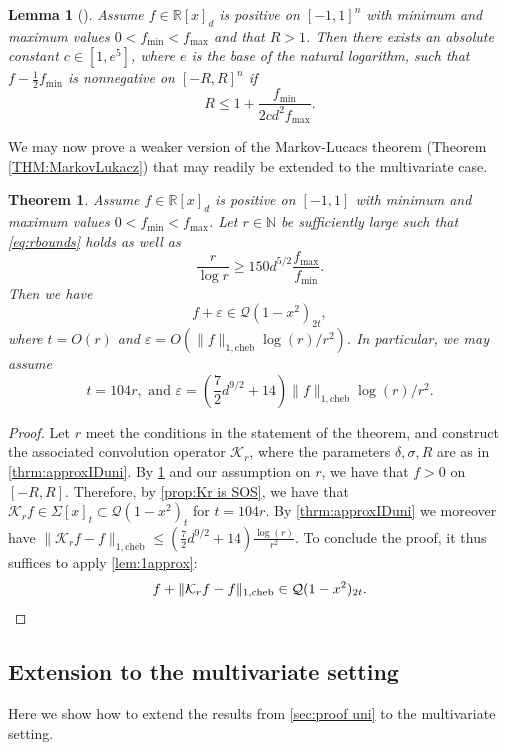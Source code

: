 \documentclass[11pt]{article}
\newcommand{\N}{\mathbb{N}}
\newcommand{\R}{\mathbb{R}}
\renewcommand{\min}{\mathrm{min}}
\renewcommand{\max}{\mathrm{max}}
\renewcommand{\epsilon}{\varepsilon}
\newcommand{\eps}{\epsilon}
\newtheorem{theorem}{Theorem}
\newtheorem{lemma}[defin]{Lemma}
\theoremstyle{definition}
\newcommand{\cheb}{{1,\mathrm{cheb}}}
\begin{document}
\begin{lemma}[{\cite{doi:10.1137/23M1555430}}] \label{lem:BS}
    Assume $f \in \R[x]_d$ is positive on $[-1,1]^n$ with minimum and maximum values $0 < f_\min <f_\max$ and that $R>1$.
    Then there exists an absolute constant $c \in [1,e^5]$, where $e$ is the base of the natural logarithm, such that
$f-\frac{1}{2}f_\min$ is nonnegative on $[-R,R]^n$ if
\[
R \le 1 + \frac{f_\min}{2cd^2f_\max}.
\]
\end{lemma}

We may now prove a weaker version of the Markov-Lucacs theorem (Theorem \ref{THM:MarkovLukacz}) that may readily be extended to the multivariate case.
\begin{theorem}
\label{thrm:main uni}
Assume $f \in \R[x]_d$ is positive on $[-1,1]$ with minimum and maximum values $0 < f_\min <f_\max$. Let $r \in \N$ be sufficiently large such that \eqref{eq:rbounds} holds as
well as
\begin{equation}
\label{eq:rbounds2}
\frac{r}{\log r}  \ge  150 d^{5/2}\frac{f_\max}{f_\min}.
\end{equation}
  Then we have
\[
f + \eps \in \mathcal Q(1-x^2)_{2t},
\]
where $t=O(r)$ and $\eps = O(\|f\|_\cheb \log(r)/r^2)$. In particular, we may assume
\[
t = {104r}, \mbox{ and }
\eps = \left( {\frac{7}{2}d^{9/2}} + 14\right)\|f\|_\cheb \log(r)/r^2.
\]
\end{theorem}

\begin{proof}
Let $r$ meet the conditions in the statement of the theorem,  and construct the associated convolution
 operator $\mathcal K_r$, where the parameters $\delta, \sigma, R$ are as in \cref{thrm:approxIDuni}.
  By \cref{lem:BS} and our assumption on $r$, we have that $f>0$ on $[-R,R]$.
  Therefore, by \cref{prop:Kr is SOS}, we have that ${\mathcal K_r f \in \Sigma[x]_t \subset \mathcal Q(1-x^2)_t}$ for  {$t = 104r$}.
   By \cref{thrm:approxIDuni} we moreover have $\|\mathcal K_r f-f\|_\cheb \le {\left( {\frac{7}{2}d^{9/2}} + 14\right)\frac{\log(r)}{r^2}}$.
   To conclude the proof, it thus suffices to apply \cref{lem:1approx}:
\[
f + \|\mathcal K_r f-f\|_\cheb \in \mathcal Q(1-x^2)_{2t}. \qedhere
\]
\end{proof}





\subsection{Extension to the multivariate setting}
\label{sec:multivariate proof}
Here we show how to extend the results from \cref{sec:proof uni} to the multivariate setting.
\end{document}

